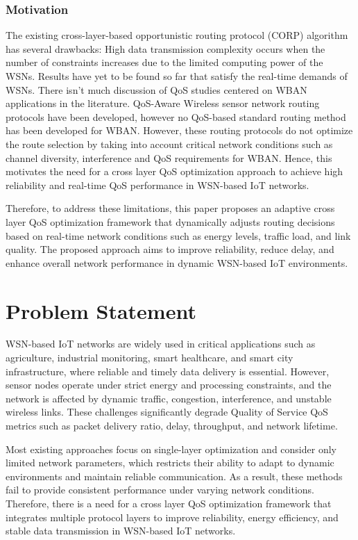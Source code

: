 \documentclass[a4paper,fleqn]{cas-dc}
\numberwithin{equation}{section}
\begin{document}
\subsubsection{Motivation}
The existing cross-layer-based opportunistic routing protocol (CORP) algorithm has several drawbacks: High data transmission complexity occurs when the number of constraints increases due to the limited computing power of the WSNs. Results have yet to be found so far that satisfy the real-time demands of WSNs. There isn't much discussion of QoS studies centered on WBAN applications in the literature. QoS-Aware Wireless sensor network routing protocols have been developed, however no QoS-based standard routing method has been developed for WBAN. However, these routing protocols do not optimize the route selection by taking into account critical network conditions such as channel diversity, interference and QoS requirements for WBAN. Hence, this motivates the need for a cross layer QoS optimization approach to achieve high reliability and real-time QoS performance in WSN-based IoT networks.

Therefore, to address these limitations, this paper proposes an adaptive cross layer QoS optimization framework that dynamically adjusts routing decisions based on real-time network conditions such as energy levels, traffic load, and link quality. The proposed approach aims to improve reliability, reduce delay, and enhance overall network performance in dynamic WSN-based IoT environments.

\section{Problem Statement}
WSN-based IoT networks are widely used in critical applications such as agriculture, industrial monitoring, smart healthcare, and smart city infrastructure, where reliable and timely data delivery is essential. However, sensor nodes operate under strict energy and processing constraints, and the network is affected by dynamic traffic, congestion, interference, and unstable wireless links. These challenges significantly degrade Quality of Service QoS metrics such as packet delivery ratio, delay, throughput, and network lifetime.

Most existing approaches focus on single-layer optimization and consider only limited network parameters, which restricts their ability to adapt to dynamic environments and maintain reliable communication. As a result, these methods fail to provide consistent performance under varying network conditions. Therefore, there is a need for a cross layer QoS optimization framework that integrates multiple protocol layers to improve reliability, energy efficiency, and stable data transmission in WSN-based IoT networks.
\end{document}
